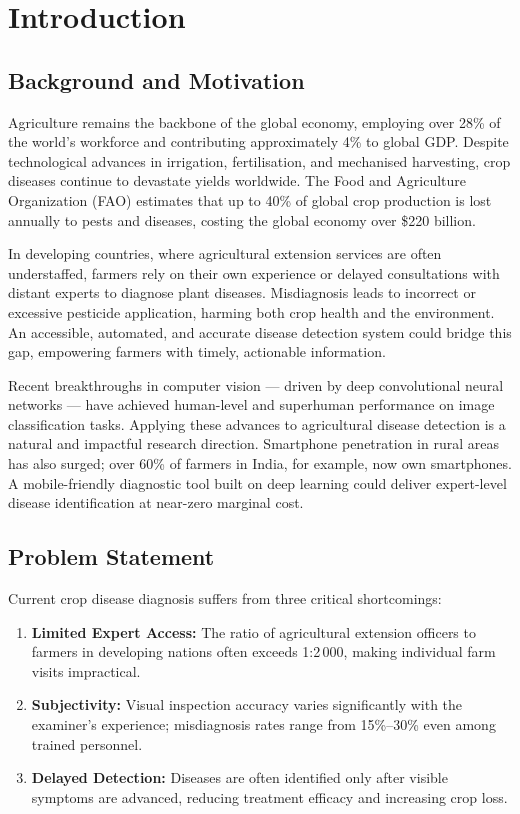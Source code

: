 \section{Introduction}

\subsection{Background and Motivation}

Agriculture remains the backbone of the global economy, employing over 28\%
of the world's workforce and contributing approximately 4\% to global GDP.
Despite technological advances in irrigation, fertilisation, and mechanised
harvesting, crop diseases continue to devastate yields worldwide. The Food
and Agriculture Organization (FAO) estimates that up to 40\% of global crop
production is lost annually to pests and diseases, costing the global economy
over \$220 billion.

\parsp
In developing countries, where agricultural extension services are often
understaffed, farmers rely on their own experience or delayed consultations
with distant experts to diagnose plant diseases. Misdiagnosis leads to
incorrect or excessive pesticide application, harming both crop health and
the environment. An accessible, automated, and accurate disease detection
system could bridge this gap, empowering farmers with timely, actionable
information.

\parsp
Recent breakthroughs in computer vision — driven by deep convolutional neural
networks — have achieved human-level and superhuman performance on image
classification tasks. Applying these advances to agricultural disease
detection is a natural and impactful research direction. Smartphone
penetration in rural areas has also surged; over 60\% of farmers in India,
for example, now own smartphones. A mobile-friendly diagnostic tool built on
deep learning could deliver expert-level disease identification at
near-zero marginal cost.

\subsection{Problem Statement}

Current crop disease diagnosis suffers from three critical shortcomings:

\begin{enumerate}[label=\textcolor{accent}{\textbullet}, leftmargin=2em, itemsep=4pt]
  \item \textbf{Limited Expert Access:} The ratio of agricultural extension
        officers to farmers in developing nations often exceeds 1:2\,000,
        making individual farm visits impractical.
  \item \textbf{Subjectivity:} Visual inspection accuracy varies significantly
        with the examiner's experience; misdiagnosis rates range from
        15\%--30\% even among trained personnel.
  \item \textbf{Delayed Detection:} Diseases are often identified only after
        visible symptoms are advanced, reducing treatment efficacy and
        increasing crop loss.
\end{enumerate}

